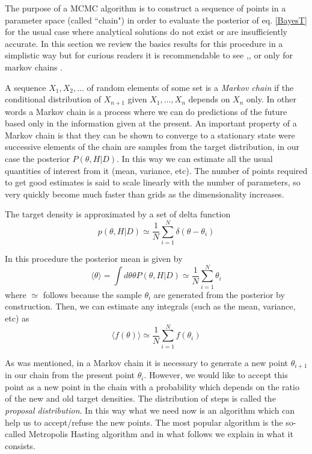 \documentclass[onecolumn,           %
               showpacs,            %
               preprintnumbers,     %
               aps,                 %
               prl,          	    %
               letterpaper,             %
               superscriptaddress,      %
               nofootinbib,         %
               tightenlines,        %
               floats,floatfix      %
               ,usenatbib,
               ]{revtex4-1}
\begin{document}
The purpose of a MCMC algorithm is to construct a sequence of points in a parameter space (called ``chain") in order to evaluate the posterior of eq. \eqref{BayesT} for the usual case where analytical solutions do not exist or are insufficiently accurate. In this section we review the basics results for this procedure in a simplistic way but for curious readers it is recommendable to see \cite{mcmc1},\cite{mcmc2}, \cite{mcmc3} or only for markov chains \cite{mcmc4}.

A sequence $X_1,X_2,...$ of random elements of some set is a \textit{Markov chain} if the conditional distribution of $X_{n+1}$ given $X_1,...,X_n$ depends on $X_n$ only. In other words a Markov chain is a process where we can do predictions of the future based only in the information given at the present. An important property of a Markov chain is that they can be shown to converge to a stationary state were successive elements of the chain are samples from the target distribution, in our case the posterior $P(\theta,H|D)$. In this way we can estimate all the usual quantities of interest from it (mean, variance, etc). The number of points required to get good estimates is said to scale linearly with the number of parameters, so very quickly become much faster than grids as the dimensionality increases.

The target density is approximated by a set of delta function
\begin{equation}
p(\theta,H|D)\simeq \frac{1}{N}\sum_{i=1}^N \delta(\theta-\theta_i)
\end{equation}

In this procedure the posterior mean is given by
\begin{equation}
\langle\theta\rangle=\int d\theta \theta P(\theta,H|D)\simeq \frac{1}{N}\sum_{i=1}^N\theta_i
\end{equation}
where $\simeq$ follows because the sample $\theta_i$ are generated from the posterior by construction. Then, we can estimate any integrals (such as the mean, variance, etc) as
\begin{equation}
\langle f(\theta)\rangle \simeq\frac{1}{N}\sum_{i=1}^N f(\theta_i)
\end{equation}

As was mentioned, in a Markov chain it is necessary to generate a new point $\theta_{i+1}$ in our chain from the present point $\theta_i$. However, we would like to accept this point as a new point in the chain with a probability which depends on the ratio of the new and old target densities. The distribution of steps is called the \textit{proposal distribution}. In this way what we need now is an algorithm which can help us to accept/refuse the new points. The most popular algorithm is the so-called Metropolis Hasting algorithm and in what follows we explain in what it consists.
\end{document}
